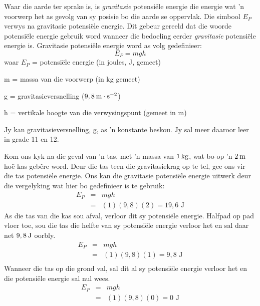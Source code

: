       \label{m38784*id66167}Waar die aarde ter sprake is, is \textsl{gravitasie} potensi\"{e}le energie die energie wat  'n voorwerp het as gevolg van sy posisie bo die aarde se oppervlak. Die simbool ${E}_{P}$ verwys na gravitasie potensiële energie. Dit gebeur gereeld dat die woorde potensiële energie gebruik word wanneer die bedoeling eerder \textsl{gravitasie} potensiële energie is. Gravitasie potensi\"{e}le energie word as volg gedefinieer:\\
      \label{m38784*uid45}\nopagebreak\noindent{}
    \begin{equation}
    {E}_{P}=mgh
      \end{equation}
      \label{m38784*id66223}waar
${E}_{P}$ = potensi\"{e}le energie (in joules, J, gemeet)\par 
      \label{m38784*id66229}m = massa van die voorwerp (in kg gemeet)\par 
      \label{m38784*id66234}g = gravitasieversnelling ($9,8\phantom{\rule{2pt}{0ex}}\text{m}\ensuremath{\cdot}\text{s}{}^{-2}$)\par 
      \label{m38784*id66266}h = vertikale hoogte van die verwysingspunt (gemeet in m)\par 
      \label{m38784*eip-306}

Jy kan gravitasieversnelling, g, as  'n konstante beskou. Jy sal meer daaroor leer in grade 11 en 12. 


Kom ons kyk na die geval van  'n tas, met  'n massa van $1\phantom{\rule{2pt}{0ex}}\text{kg}$, wat bo-op  'n $2\phantom{\rule{2pt}{0ex}}\text{m}$ ho\"{e} kas geb\^{e}re word. Deur die tas teen die gravitasiekrag op te tel, gee ons vir die tas potensi\"{e}le energie. Ons kan die gravitasie potensi\"{e}le energie uitwerk deur die vergelyking wat hier bo gedefinieer is te gebruik:
\begin{eqnarray*}
E_{P} & = & mgh \\
& = & (1)(9,8)(2) = 19,6 \text{ J}
\end{eqnarray*}
As die tas van die kas sou afval, verloor dit sy potensiële energie. Halfpad op pad vloer toe, sou die tas die helfte van sy potensiële energie verloor het en sal daar net $9,8\phantom{\rule{2pt}{0ex}}\text{J}$ oorbly. 
\begin{eqnarray*}
E_{P} & = & mgh \\
& = & (1)(9,8)(1) = 9,8 \text{ J} \\
\end{eqnarray*}
Wanneer die tas op die grond val, sal dit al sy potensi\"{e}le energie verloor het en die potensi\"{e}le energie sal nul wees.
\begin{eqnarray*}
E_{P} & = & mgh \\
& = & (1)(9,8)(0) = 0 \text{ J} \\
\end{eqnarray*}


